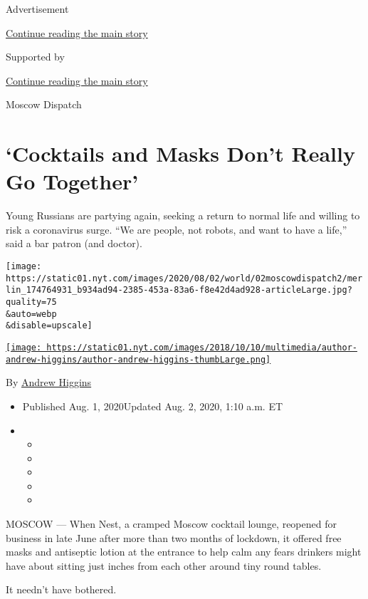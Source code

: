 Advertisement

\protect\hyperlink{after-top}{Continue reading the main story}

Supported by

\protect\hyperlink{after-sponsor}{Continue reading the main story}

Moscow Dispatch

\hypertarget{cocktails-and-masks-dont-really-go-together}{%
\section{`Cocktails and Masks Don't Really Go
Together'}\label{cocktails-and-masks-dont-really-go-together}}

Young Russians are partying again, seeking a return to normal life and
willing to risk a coronavirus surge. ``We are people, not robots, and
want to have a life,'' said a bar patron (and doctor).

\texttt{[image: https://static01.nyt.com/images/2020/08/02/world/02moscowdispatch2/merlin\_174764931\_b934ad94-2385-453a-83a6-f8e42d4ad928-articleLarge.jpg?quality=75\\\&auto=webp\\\&disable=upscale]}

\href{https://www.nytimes.com/by/andrew-higgins}{\texttt{[image: https://static01.nyt.com/images/2018/10/10/multimedia/author-andrew-higgins/author-andrew-higgins-thumbLarge.png]}}

By \href{https://www.nytimes.com/by/andrew-higgins}{Andrew Higgins}

\begin{itemize}
\item
  Published Aug. 1, 2020Updated Aug. 2, 2020, 1:10 a.m. ET
\item
  \begin{itemize}
  \item
  \item
  \item
  \item
  \item
  \end{itemize}
\end{itemize}

MOSCOW --- When Nest, a cramped Moscow cocktail lounge, reopened for
business in late June after more than two months of lockdown, it offered
free masks and antiseptic lotion at the entrance to help calm any fears
drinkers might have about sitting just inches from each other around
tiny round tables.

It needn't have bothered.

